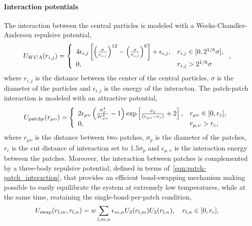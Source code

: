 \paragraph{Interaction potentials} The interaction between the central particles is modeled with a Weeks-Chandler-Andersen repulsive potential,
\begin{gather}
    U_{WCA}(r_{i,j}) =\left\{ 
        \begin{array}{ll}
            4\epsilon_{i,j}\left[\qty(\frac{\sigma}{r_{i,j}})^{12}-\qty(\frac{\sigma}{r_{i,j}})^6\right]+\epsilon_{i,j}, & r_{i,j}\in[0,2^{1/6}\sigma], \\
            0, & r_{i,j}>2^{1/6}\sigma
        \end{array}
\right.
    ,\label{eqn:CL-MO_interaction}
\end{gather}
where $r_{i,j}$ is the distance between the center of the central particles, $\sigma$ is the diameter of the particles and $\epsilon_{i,j}$ is the energy of the interacton.
The patch-patch interaction is modeled with an attractive potential,
\begin{gather}
    U_{\mathrm{patchy}}\qty(r_{\mu\upsilon}) = \left\{
        \begin{array}{ll}
            2\epsilon_{\mu\upsilon}\left(\frac{\sigma_p^4}{2 r_{\mu\upsilon}^4}-1\right)\exp\left[\frac{\sigma_p}{\qty(r_{\mu\upsilon}-r_{c})}+2\right], & r_{\mu\upsilon}\in\qty[0,r_c], \\
            0, & r_{\mu,\upsilon}>r_c,
        \end{array}
            \right.\label{eqn:patch-patch_interaction}
\end{gather}
where $r_{\mu\upsilon}$ is the distance between two patches, $\sigma_p$ is the diameter of the patches, $r_c$ is the cut distance of interaction set to $1.5\sigma_p$ and $\epsilon_{\mu,\upsilon}$ is the interaction energy between the patches.
Moreover, the interaction between patches is complemented by a three-body repulsive potential, defined in terms of~\eqref{eqn:patch-patch_interaction}, that provides an efficient bond-swapping mechanism making possible to easily equilibrate the system at extremely low temperatures, while at the same time, reataining the single-bond-per-patch condition\citep{sciortinoThreebodyPotentialSimulating2017},
\begin{gather}
    U_{\mathrm{swap}}(r_{l,m},r_{l,n}) = w\sum_{l,m,n}\epsilon_{m,n}U_3\qty(r_{l,m})U_3\qty(r_{l,n}),\quad r_{l,n}\in\qty[0,r_c],\label{eqn:swap_interaction}
\end{gather}
